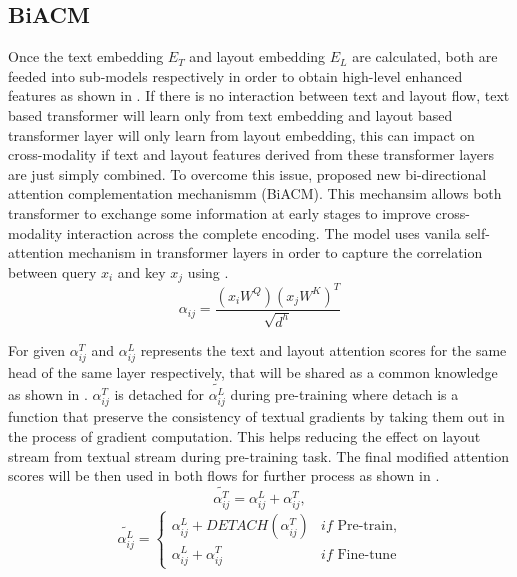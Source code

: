 \subsection{BiACM}

Once the text embedding $E_T$ and layout embedding $E_L$ are calculated, both are feeded into sub-models respectively in order to obtain high-level enhanced features as shown in . If there is no interaction between text and layout flow, text based transformer will learn only from text embedding and layout based transformer layer will only learn from layout embedding, this can impact on cross-modality if text and layout features derived from these transformer layers are just simply combined. To overcome this issue, \cite{wang-etal-2022-lilt} proposed new bi-directional attention complementation mechanismm (BiACM). This mechansim allows both transformer to exchange some information at early stages to improve cross-modality interaction across the complete encoding. The model uses vanila self-attention mechanism in transformer layers in order to capture the correlation between query $x_i$ and key $x_j$ using .  
\begin{equation}
    \alpha_{ij} =  \frac{(x_iW^Q)(x_jW^K)^T}{\sqrt{d^h}}
    \label{eq:vanila_mechanism}
\end{equation}

For given $\alpha_{ij}^T$ and $\alpha_{ij}^L$ represents the text and layout attention scores for the same head of the same layer respectively, that will be shared as a common knowledge  as shown in . $\alpha_{ij}^T$ is detached for $\widetilde{\alpha_{ij}^L}$ during pre-training where detach is a function that preserve the consistency of textual gradients by taking them out in the process of gradient computation. This helps reducing the effect on layout stream from textual stream during pre-training task. The final modified attention scores will be then used in both flows for further process as shown in . 
\begin{equation}
    \widetilde{\alpha_{ij}^T} = \alpha_{ij}^L + \alpha_{ij}^T,
    \label{eq:BiACM}
\end{equation}
\[ \widetilde{\alpha_{ij}^L} = \left\{\begin{matrix}
 \alpha_{ij}^L + DETACH(\alpha_{ij}^T)&if\text{ Pre-train,}\\ 
 \alpha_{ij}^L + \alpha_{ij}^T&  if\text{ Fine-tune}
\end{matrix}\right.\]




